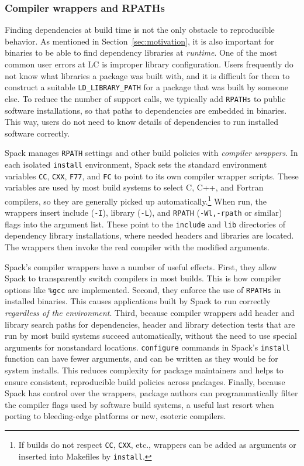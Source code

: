 \subsubsection{Compiler wrappers and RPATHs}
Finding dependencies at build time is not the only obstacle to reproducible
behavior.  As mentioned in Section~\ref{sec:motivation}, it is also important
for binaries to be able to find dependency libraries at {\it runtime}.
One of the most common user errors at LC is improper library configuration.
Users frequently do not know what libraries a package was built with, and 
it is difficult for them to construct a suitable {\tt LD\_LIBRARY\_PATH} for
a package that was built by someone else.  To reduce the number of support calls,
we typically add {\tt RPATHs} to public software installations, so that paths
to dependencies are embedded in binaries. This way, users do not need to know
details of dependencies to run installed software correctly.

Spack manages {\tt RPATH} settings and other build policies with
{\it compiler wrappers}. 
In each isolated {\tt install} environment, Spack sets the standard 
environment variables
{\tt CC}, {\tt CXX}, {\tt F77}, and {\tt FC} to point to its own compiler
wrapper scripts.  These variables are used by most build systems to select
C, C++, and Fortran compilers, so they are generally picked up 
automatically.\footnote{If builds do not respect {\tt CC}, {\tt CXX}, etc.,
wrappers can be added as arguments or inserted into Makefiles
by {\tt install}.}
When run, the wrappers insert include ({\tt -I}), library ({\tt -L}), and 
{\tt RPATH} ({\tt -Wl,-rpath} or similar) flags into the argument list.
These point to the {\tt include} and {\tt lib} directories of dependency
library installations, where needed headers and libraries are located.
The wrappers then invoke the real compiler with the modified arguments.

Spack's compiler wrappers have a number of useful effects.  First, they allow
Spack to transparently switch compilers in most builds.  This is how
compiler options like {\tt \%gcc} are implemented.  Second, they enforce the
use of {\tt RPATHs} in
installed binaries.  This causes applications built by Spack to run correctly
{\it regardless of the environment}.  Third, because compiler wrappers add 
header and library search paths for dependencies, header and library detection
tests that are run by most build systems succeed automatically, without
the need to use special arguments for nonstandard locations.  {\tt configure}
commands in Spack's {\tt install} function can have fewer arguments, and can
be written as they would be for system installs.  This reduces complexity
for package maintainers and helps to ensure consistent, reproducible
build policies across packages.  Finally, because Spack has control over the 
wrappers, package authors can programmatically filter the compiler flags
used by software build systems, a useful last resort when porting to
bleeding-edge platforms or new, esoteric compilers.


